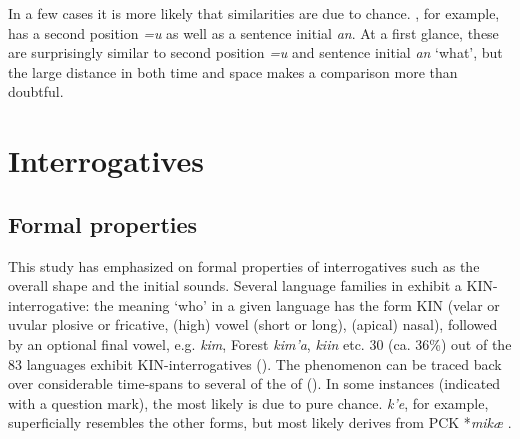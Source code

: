 In a few cases it is more likely that similarities are due to chance. , for example, has a second position  \textit{=u} as well as a sentence initial  \textit{an}. At a first glance, these are surprisingly similar to  second position \textit{=u} and sentence initial \textit{an} ‘what’, but the large distance in both time and space makes a comparison more than doubtful.

\section{Interrogatives}\label{sec:6.2}
\subsection{Formal properties}\label{sec:6.2.1}

This study has emphasized on formal properties of interrogatives such as the overall shape and the initial sounds. Several language families in  exhibit a KIN-inter\-ro\-ga\-tive: the  meaning ‘who’ in a given language has the form KIN (velar or uvular plosive or fricative, (high) vowel (short or long), (apical) nasal), followed by an optional final vowel, e.g.  \textit{kim}, Forest  \textit{kim’a},  \textit{kiin} etc. 30 (ca. 36\%) out of the 83 languages exhibit KIN-interrogatives (). The phenomenon can be traced back over considerable time-spans to several of the  of  (). In some instances (indicated with a question mark), the  most likely is due to pure chance.  \textit{k’e}, for example, superficially resembles the other forms, but most likely derives from PCK *\textit{mikæ} \citep{Fortescue2005}.


